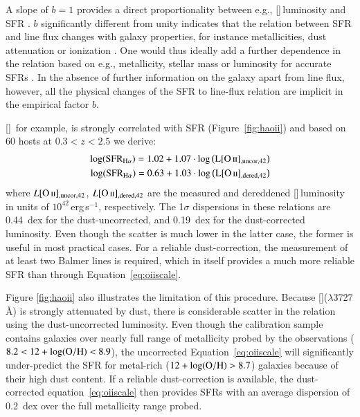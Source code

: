 \documentclass[traditabstract, longauth]{aa}
\newcommand{\oh}{12+\log(\rm{O/H})}
\newcommand{\oii}{[\ion{O}{ii}]}
\begin{document}
A slope of $b=1$ provides a direct proportionality between e.g., \oii\,luminosity and SFR \citep{1998ARA&A..36..189K, 2009ApJ...691..182S}. $b$ significantly different from unity indicates that the relation between SFR and line flux changes with galaxy properties, for instance metallicities, dust attenuation or ionization \citep[e.g.,][]{2004AJ....127.2002K}. One would thus ideally add a further dependence in the relation based on e.g., metallicity, stellar mass or luminosity for accurate SFRs \citep{2004AJ....127.2002K, 2010MNRAS.405.2594G}. In the absence of further information on the galaxy apart from line flux, however, all the physical changes of the SFR to line-flux relation are implicit in the empirical factor $b$.

\oii\, for example, is strongly correlated with SFR (Figure~\ref{fig:haoii}) and based on  {60 hosts at $0.3 < z < 2.5$} we derive:
\begin{equation}
\label{eq:oiiscale}
\begin{split}
\log(\rm{SFR_{H\alpha}}) = 1.02 + 1.07\cdot\log\left(L{\oii_{\rm{,uncor,42}}}\right)\\
\log(\rm{SFR_{H\alpha}}) = 0.63 + 1.03\cdot\log\left(L{\oii_{\rm{,dered,42}}}\right)
\end{split}
\end{equation}
where $L{\oii_{\rm{,uncor,42}}}$, $L{\oii_{\rm{,dered,42}}}$ are the measured and dereddened \oii\,luminosity in units of $10^{42}$\,erg\,{s}$^{-1}$, respectively.  The 1$\sigma$ dispersions in these relations are 0.44~dex for the dust-uncorrected, and 0.19~dex for the dust-corrected luminosity. Even though the scatter is much lower in the latter case, the former is useful in most practical cases. For a reliable dust-correction, the measurement of at least two Balmer lines is required, which in itself provides a much more reliable SFR than through Equation~\ref{eq:oiiscale}. 

 {Figure \ref{fig:haoii} also illustrates the limitation of this procedure. Because \oii($\lambda$3727\,\AA) is strongly attenuated by dust, there is considerable scatter in the relation using the dust-uncorrected luminosity. Even though the calibration sample contains galaxies over nearly full range of metallicity probed by the observations ($8.2 < \oh < 8.9$), the uncorrected Equation~\ref{eq:oiiscale} will significantly under-predict the SFR for metal-rich ($\oh > 8.7$) galaxies because of their high dust content. If a reliable dust-correction is available, the dust-corrected equation~\ref{eq:oiiscale} then provides SFRs with an average dispersion of 0.2~dex over the full metallicity range probed.}
\end{document}
